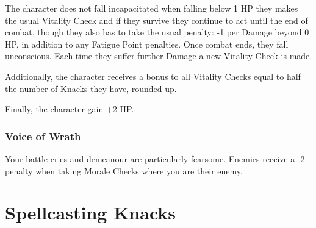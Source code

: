 \documentclass[titlepage,a4paper,openany]{book}
\begin{document}
\begin{multicols}{2}
The character does not fall incapacitated when falling below 1 HP they makes the usual Vitality Check and if they survive they continue to act until the end of combat, though they also has to take the usual penalty: -1 per Damage beyond 0 HP, in addition to any Fatigue Point penalties. Once combat ends, they fall unconscious. Each time they suffer further Damage a new Vitality Check is made.

Additionally, the character receives a bonus to all Vitality Checks equal to half the number of Knacks they have, rounded up.

Finally, the character gain +2 HP.

\subsubsection{Voice of Wrath}

Your battle cries and demeanour are particularly fearsome. Enemies receive a -2 penalty when taking Morale Checks where you are their enemy.

\end{multicols}

\section{Spellcasting Knacks}
\end{document}
